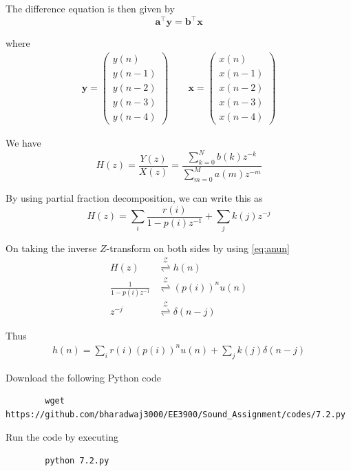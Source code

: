 \documentclass[journal,12pt,twocolumn]{IEEEtran}
\providecommand{\brak}[1]{\ensuremath{\left(#1\right)}}
\providecommand{\ztrans}{\overset{\mathcal{Z}}{ \rightleftharpoons}}
\let\vec\mathbf
\numberwithin{equation}{section}
\renewcommand\thesection{\arabic{section}}
\newcommand{\myvec}[1]{\ensuremath{\begin{pmatrix}#1\end{pmatrix}}}
\begin{document}
\begin{enumerate}[label=\thesection.\arabic*]
	The difference equation is then given by
	\begin{equation}
		\vec{a}^\top \vec{y} = \vec{b}^\top \vec{x} 
	\end{equation}
	
	where
	\begin{align}
		\vec{y} = \myvec{y(n) \\ y(n-1) \\ y(n-2) \\ y(n-3) \\ y(n-4)} \qquad
		\vec{x} = \myvec{x(n) \\ x(n-1) \\ x(n-2) \\ x(n-3) \\ x(n-4)}
	\end{align}
	
	We have
	\begin{equation}
		H(z) = \frac{Y(z)}{X(z)} = \frac{\sum _{k=0}^{N}b\brak{k} z^{-k}}{\sum _{m=0}^{M}a\brak{m} z^{-m}}
	\end{equation}
	
	By using partial fraction decomposition, we can write this as
	\begin{equation}
		H(z) = \sum_i \frac{r(i)}{1-p(i)z^{-1}} + \sum_j k(j)z^{-j}
	\end{equation}
	
	On taking the inverse $Z$-transform on both sides by using \eqref{eq:anun}
	\begin{align}
		H(z) &\ztrans h(n) \\
		\frac{1}{1-p(i)z^{-1}} &\ztrans \brak{p(i)}^nu(n) \\
		z^{-j} &\ztrans \delta(n-j) 
	\end{align}
	
	Thus
	\begin{align}
		h(n) = \sum_i r(i)\brak{p(i)}^nu(n) + \sum_j k(j)\delta(n-j)
	\end{align}
	
	Download the following Python code
	\begin{lstlisting}
		wget https://github.com/bharadwaj3000/EE3900/Sound_Assignment/codes/7.2.py
	\end{lstlisting}
	
	Run the code by executing
	\begin{lstlisting}
		python 7.2.py
	\end{lstlisting}
	

\end{enumerate}
\end{document}
